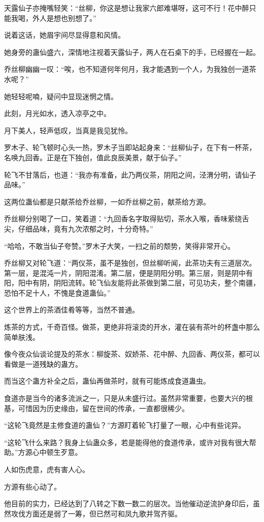 \begin{this_body}
天露仙子亦掩嘴轻笑：“丝柳，你这是想让我家六郎难堪呀，这可不行！花中醉只能我喝，外人是想也别想了。”

说着这话，她眉宇间尽显得意和风情。

她身旁的蛊仙盛六，深情地注视着天露仙子，两人在石桌下的手，已经握在一起。

乔丝柳幽幽一叹：“唉，也不知道何年何月，我才能遇到一个人，为我独创一道茶水呢？”

她轻轻呢喃，疑问中显现迷惘之情。

此刻，月光如水，透入凉亭之中。

月下美人，轻声低叹，当真是我见犹怜。

罗木子、轮飞顿时心头一热，罗木子当即站起身来：“丝柳仙子，在下有一杯茶，名唤九回香。正是在下独创，值此良辰美景，献于仙子。”

轮飞不甘落后，也道：“我亦有准备，此乃两仪茶，阴阳之间，泾渭分明，请仙子品味。”

这两位蛊仙都是只献茶给乔丝柳，一如乔丝柳之前，献茶给方源。

乔丝柳分别喝了一口，笑着道：“九回香名字取得贴切，茶水入喉，香味萦绕舌尖，仔细品味，竟有九次浓郁之时，十分奇特。”

“哈哈，不敢当仙子夸赞。”罗木子大笑，一扫之前的颓势，笑得非常开心。

乔丝柳又对轮飞道：“两仪茶，虽不是独创，但丝柳听闻，此茶功夫有三道层次。第一层，是混沌一片，阴阳混淆。第二层，便是阴阳分明。第三层，则是阴中有阳，阳中有阴，阴阳流转。轮飞仙友能将此茶做到第二层，可见功夫，整个南疆，恐怕不足十人，不愧是食道蛊仙。”

这个世界上的茶酒佳肴等等，当然不普通。

炼茶的方式，千奇百怪。做茶，更绝非将滚烫的开水，灌在装有茶叶的杯盏中那么简单肤浅。

像今夜众仙谈论提及的茶水：柳旋茶、奴娇茶、花中醉、九回香、两仪茶，都可以看做是一道残缺的蛊方。

而当这个蛊方补全之后，蛊仙再做茶时，就有可能炼成食道蛊虫。

食道亦是当今的诸多流派之一，只是从未盛行过。虽然非常重要，也要大兴的根基，可惜因为历史缘由，留在世间的传承，一直都很稀少。

“这轮飞竟然是主修食道的蛊仙？”方源盯着轮飞打量了一眼，心中有些诧异。

“这轮飞什么来路？我身上仙蛊众多，若是能得他的食道传承，或许对我有很大帮助。”方源心中顿生歹意。

人如伤虎意，虎有害人心。

方源有些心动了。

他目前的实力，已经达到了八转之下数一数二的层次。当他催动逆流护身印后，虽然攻伐方面还是弱了一筹，但已然可和凤九歌并驾齐驱。


\end{this_body}
